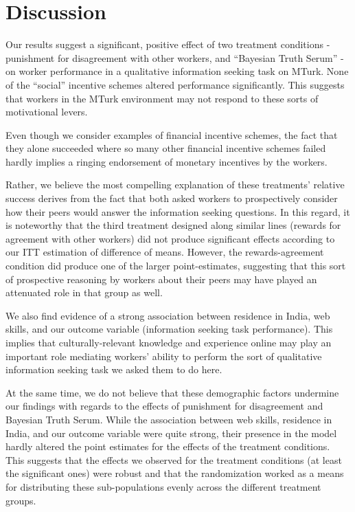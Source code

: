 \documentclass{chi2009}
\begin{document}
\section{Discussion}

Our results suggest a significant, positive effect of two treatment
conditions - punishment for disagreement with other workers, and
``Bayesian Truth Serum'' - on worker performance in a qualitative
information seeking task on MTurk. None of the ``social'' incentive
schemes altered performance significantly. This suggests that workers
in the MTurk environment may not respond to these sorts of
motivational levers.

Even though we consider examples of financial incentive schemes, the
fact that they alone succeeded where so many other financial incentive
schemes failed hardly implies a ringing endorsement of monetary
incentives by the workers.

Rather, we believe the most compelling explanation of these
treatments' relative success derives from the fact that both asked
workers to prospectively consider how their peers would answer the
information seeking questions. In this regard, it is noteworthy that
the third treatment designed along similar lines (rewards for
agreement with other workers) did not produce significant effects
according to our ITT estimation of difference of means. However, the
rewards-agreement condition did produce one of the larger
point-estimates, suggesting that this sort of prospective reasoning by
workers about their peers may have played an attenuated role in that
group as well.

We also find evidence of a strong association between residence in
India, web skills, and our outcome variable (information seeking task
performance). This implies that culturally-relevant knowledge and
experience online may play an important role mediating workers'
ability to perform the sort of qualitative information seeking task we
asked them to do here.

At the same time, we do not believe that these demographic factors
undermine our findings with regards to the effects of punishment for
disagreement and Bayesian Truth Serum. While the association between
web skills, residence in India, and our outcome variable were quite
strong, their presence in the model hardly altered the point estimates
for the effects of the treatment conditions. This suggests that the
effects we observed for the treatment conditions (at least the
significant ones) were robust and that the randomization worked as a
means for distributing these sub-populations evenly across the
different treatment groups.
\end{document}
